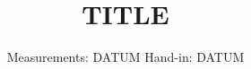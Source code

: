 

\subject{VXXX}
\title{TITLE}
\date{%
  Measurements: DATUM
  \hspace{3em}
  Hand-in: DATUM
}



\maketitle
\thispagestyle{empty}
\tableofcontents
\newpage






\printbibliography{}



